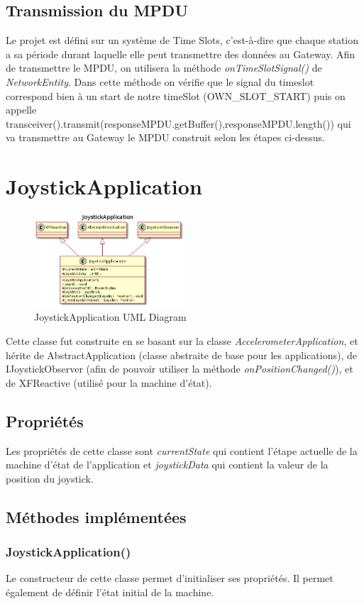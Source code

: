 \documentclass{report}
\begin{document}
\subsection{Transmission du MPDU}
Le projet est défini sur un système de Time Slots, c'est-à-dire que chaque station a sa période durant laquelle elle peut transmettre des données au Gateway. Afin de transmettre le MPDU, on utilisera la méthode \textit{onTimeSlotSignal()} de \textit{NetworkEntity}. Dans cette méthode on vérifie que le signal du timeslot correspond bien à un start de notre timeSlot (OWN\_SLOT\_START) puis on appelle 
transceiver().transmit(responseMPDU.getBuffer(),responseMPDU.length()) qui va transmettre au Gateway le MPDU construit selon les étapes ci-dessus.
\section{JoystickApplication}
\begin{figure}[H]
    \centering
    \includegraphics[width= 0.5\textwidth]{Images/JoystickApp.png}
    \caption{JoystickApplication UML Diagram}
    \label{fig:JoystickAppUML}
\end{figure}
Cette classe fut construite en se basant sur la classe \textit{AccelerometerApplication}, et hérite de AbstractApplication (classe abstraite de base pour les applications), de IJoystickObserver (afin de pouvoir utiliser la méthode \textit{onPositionChanged()}), et de XFReactive (utilisé pour la machine d'état).
\subsection{Propriétés}
Les propriétés de cette classe sont \textit{currentState} qui contient l'étape actuelle de la machine d'état de l'application et \textit{joystickData} qui contient la valeur de la position du joystick.
\subsection{Méthodes implémentées}
\subsubsection{JoystickApplication()}
Le constructeur de cette classe permet d'initialiser ses propriétés. Il permet également de définir l'état initial de la machine.
\end{document}
